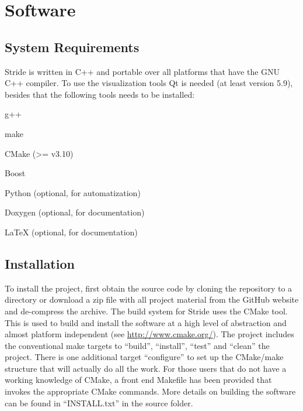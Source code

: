 \chapter{Software}
\label{chap:software}


\section{System Requirements}
\label{section:system}

Stride is written in C++ and portable over all platforms that have the GNU C++ compiler. 
To use the visualization tools Qt is needed (at least version 5.9), besides that the following tools needs to be installed:
\begin{compactitem}
    \item g++
    \item make
    \item CMake (>= v3.10)
    \item Boost
    \item Python (optional, for automatization)
    \item Doxygen (optional, for documentation)
    \item LaTeX (optional, for documentation)
\end{compactitem}


\section{Installation}
\label{section:Installation}

To install the project, first obtain the source code by cloning the repository to a directory or download a zip file with all project
material from the GitHub website and de-compress the archive. 
The build system for Stride uses the CMake tool. This is used to build and install the software at a high level of abstraction and almost platform independent (see \url{http://www.cmake.org/}). 
The project includes the conventional make targets to ``build'', ``install'', ``test'' and ``clean'' the project. There is one additional target ``configure'' to set up the CMake/make structure that will actually do all the work.
For those users that do not have a working knowledge of CMake, a front end Makefile has been provided that invokes the appropriate CMake commands.
More details on building the software can be found in ``INSTALL.txt'' in the source folder.


